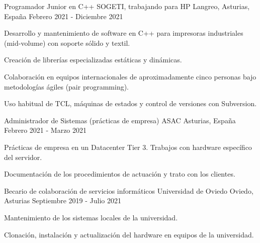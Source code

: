 \begin{cventries}
    \cventry
    {Programador Junior en C++} %
    {SOGETI, trabajando para HP} %
    {Langreo, Asturias, España} %
    {Febrero 2021 - Diciembre 2021} %
    {
        \begin{cvitems}
            \item {Desarrollo y mantenimiento de software en C++ para impresoras industriales (mid-volume) con soporte sólido y textil.}
            \item {Creación de librerías especializadas estáticas y dinámicas.}
            \item {Colaboración en equipos internacionales de aproximadamente cinco personas bajo metodologías ágiles (pair programming).}
            \item {Uso habitual de TCL, máquinas de estados y control de versiones con Subversion.}
        \end{cvitems}
    }
    \cventry
    {Administrador de Sistemas (prácticas de empresa)} %
    {ASAC} %
    {Asturias, España} %
    {Febrero 2021 - Marzo 2021} %
    {
        \begin{cvitems}
            \item {Prácticas de empresa en un Datacenter Tier 3. Trabajos con hardware específico del servidor.}
            \item {Documentación de los procedimientos de actuación y trato con los clientes.}
        \end{cvitems}
    }
    \cventry
    {Becario de colaboración de servicios informáticos} %
    {Universidad de Oviedo} %
    {Oviedo, Asturias} %
    {Septiembre 2019 - Julio 2021} %
    {
        \begin{cvitems}
            \item {Mantenimiento de los sistemas locales de la universidad.}
            \item {Clonación, instalación y actualización del hardware en equipos de la universidad.}
        \end{cvitems}
    }
\end{cventries}
